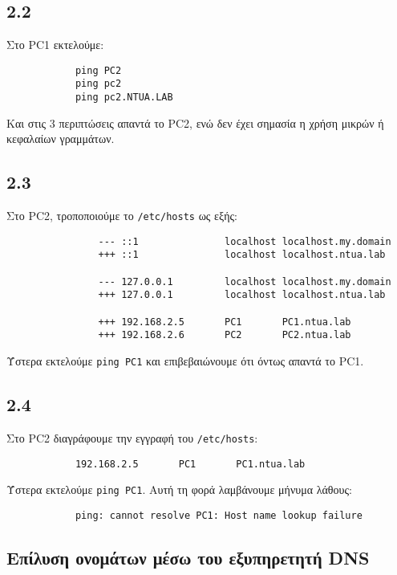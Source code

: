 \documentclass[a4paper, 12pt]{article}
\begin{document}
	\subsection*{2.2}
		Στο PC1 εκτελούμε:
		
		\begin{verbatim}
			ping PC2
			ping pc2
			ping pc2.NTUA.LAB
		\end{verbatim}
		
		Και στις 3 περιπτώσεις απαντά το PC2, ενώ δεν έχει σημασία η χρήση μικρών ή κεφαλαίων γραμμάτων.
		
	\subsection*{2.3}
		Στο PC2, τροποποιούμε το \verb|/etc/hosts| ως εξής:
		
		\begin{verbatim}
				--- ::1               localhost localhost.my.domain
				+++ ::1               localhost localhost.ntua.lab
				
				--- 127.0.0.1         localhost localhost.my.domain
				+++ 127.0.0.1         localhost localhost.ntua.lab
				
				+++ 192.168.2.5       PC1       PC1.ntua.lab
				+++ 192.168.2.6       PC2       PC2.ntua.lab
		\end{verbatim}
		
		Ύστερα εκτελούμε \verb|ping PC1| και επιβεβαιώνουμε ότι όντως απαντά το PC1.

	\subsection*{2.4}
		Στο PC2 διαγράφουμε την εγγραφή του \verb|/etc/hosts|:
		
		\begin{verbatim}
			192.168.2.5       PC1       PC1.ntua.lab
		\end{verbatim}
		
		Ύστερα εκτελούμε \verb|ping PC1|. Αυτή τη φορά λαμβάνουμε μήνυμα λάθους:
		
		\begin{verbatim}
			ping: cannot resolve PC1: Host name lookup failure
		\end{verbatim}

	\subsection*{Επίλυση ονομάτων μέσω του εξυπηρετητή DNS}
\end{document}

